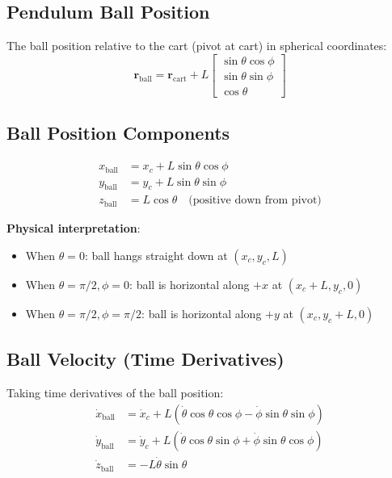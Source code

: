 \documentclass[12pt]{article}
\begin{document}
\subsection{Pendulum Ball Position}

The ball position relative to the cart (pivot at cart) in spherical coordinates:
\begin{equation}
    \mathbf{r}_{\text{ball}} = \mathbf{r}_{\text{cart}} + L
    \begin{bmatrix}
        \sin\theta\cos\phi \\
        \sin\theta\sin\phi \\
        \cos\theta
    \end{bmatrix}
\end{equation}

\subsection{Ball Position Components}
\begin{align}
    x_{\text{ball}} &= x_c + L\sin\theta\cos\phi \\
    y_{\text{ball}} &= y_c + L\sin\theta\sin\phi \\
    z_{\text{ball}} &= L\cos\theta \quad \text{(positive down from pivot)}
\end{align}

\textbf{Physical interpretation}:
\begin{itemize}
    \item When $\theta = 0$: ball hangs straight down at $(x_c, y_c, L)$
    \item When $\theta = \pi/2, \phi = 0$: ball is horizontal along $+x$ at $(x_c + L, y_c, 0)$
    \item When $\theta = \pi/2, \phi = \pi/2$: ball is horizontal along $+y$ at $(x_c, y_c + L, 0)$
\end{itemize}

\subsection{Ball Velocity (Time Derivatives)}

Taking time derivatives of the ball position:
\begin{align}
    \dot{x}_{\text{ball}} &= \dot{x}_c + L(\dot{\theta}\cos\theta\cos\phi - \dot{\phi}\sin\theta\sin\phi) \\
    \dot{y}_{\text{ball}} &= \dot{y}_c + L(\dot{\theta}\cos\theta\sin\phi + \dot{\phi}\sin\theta\cos\phi) \\
    \dot{z}_{\text{ball}} &= -L\dot{\theta}\sin\theta
\end{align}
\end{document}
